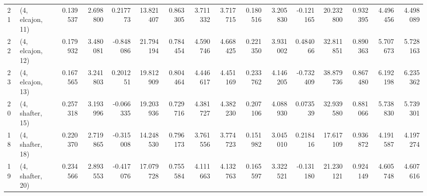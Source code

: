 \begin{tabular}{llrrrrrrrrrrrrrr}
21 &  (4, elcajon, 11) &   0.139537 &  2.698800 &  0.217773 &  13.821407 &  0.863305 &   3.711332 &  3.717715 &  0.180516 &  3.205830 & -0.121165 &   20.232800 &  0.932395 &   4.496456 &   4.498089 \\
22 &  (4, elcajon, 12) &   0.179932 &  3.480081 & -0.848086 &  21.794194 &  0.784454 &   4.590746 &  4.668425 &  0.221350 &  3.931002 &  0.484066 &   32.811851 &  0.890363 &   5.707673 &   5.728163 \\
23 &  (4, elcajon, 13) &   0.167565 &  3.241803 &  0.201251 &  19.812909 &  0.804464 &   4.446617 &  4.451169 &  0.233762 &  4.146205 & -0.732409 &   38.879736 &  0.867480 &   6.192198 &   6.235362 \\
20 &  (4, shafter, 15) &   0.257318 &  3.193996 & -0.066335 &  19.203936 &  0.729716 &   4.381727 &  4.382230 &  0.207106 &  4.088930 &  0.073539 &   32.939580 &  0.881066 &   5.738830 &   5.739301 \\
18 &  (4, shafter, 18) &   0.220370 &  2.719865 & -0.315008 &  14.248530 &  0.796173 &   3.761556 &  3.774723 &  0.151982 &  3.045010 &  0.218416 &   17.617109 &  0.936872 &   4.191587 &   4.197274 \\
19 &  (4, shafter, 20) &   0.234566 &  2.893553 & -0.417076 &  17.079728 &  0.755584 &   4.111663 &  4.132763 &  0.165597 &  3.322521 & -0.131180 &   21.230121 &  0.924149 &   4.605748 &   4.607616 \\
\bottomrule
\end{tabular}
